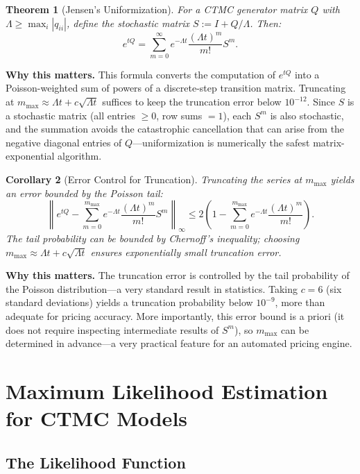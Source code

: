 \documentclass[11pt,a4paper,openany]{book}
\theoremstyle{definition}
\theoremstyle{plain}
\newtheorem{theorem}{Theorem}[chapter]
\newtheorem{corollary}[theorem]{Corollary}
\theoremstyle{remark}
\newcommand{\1}{\mathbbm{1}}
\begin{document}
\begin{theorem}[Jensen's Uniformization]
For a CTMC generator matrix $Q$ with $\Lambda \geq \max_{i} |q_{ii}|$, define the stochastic matrix $S := I + Q/\Lambda$. Then:
\[
\boxed{e^{tQ} = \sum_{m=0}^{\infty} e^{-\Lambda t} \frac{(\Lambda t)^{m}}{m!} S^{m}}.
\]
\end{theorem}

\medskip
\noindent\textbf{Why this matters.} This formula converts the computation of $e^{tQ}$ into a Poisson-weighted sum of powers of a discrete-step transition matrix. Truncating at $m_{\max} \approx \Lambda t + c\sqrt{\Lambda t}$ suffices to keep the truncation error below $10^{-12}$. Since $S$ is a stochastic matrix (all entries $\ge 0$, row sums $=1$), each $S^m$ is also stochastic, and the summation avoids the catastrophic cancellation that can arise from the negative diagonal entries of $Q$---uniformization is numerically the safest matrix-exponential algorithm.

\begin{corollary}[Error Control for Truncation]
Truncating the series at $m_{\max}$ yields an error bounded by the Poisson tail:
\[
\left\| e^{tQ} - \sum_{m=0}^{m_{\max}} e^{-\Lambda t} \frac{(\Lambda t)^{m}}{m!} S^{m} \right\|_{\infty} \leq 2\left(1 - \sum_{m=0}^{m_{\max}} e^{-\Lambda t} \frac{(\Lambda t)^{m}}{m!}\right).
\]
The tail probability can be bounded by Chernoff's inequality; choosing $m_{\max} \approx \Lambda t + c \sqrt{\Lambda t}$ ensures exponentially small truncation error.
\end{corollary}

\medskip
\noindent\textbf{Why this matters.} The truncation error is controlled by the tail probability of the Poisson distribution---a very standard result in statistics. Taking $c=6$ (six standard deviations) yields a truncation probability below $10^{-9}$, more than adequate for pricing accuracy. More importantly, this error bound is a priori (it does not require inspecting intermediate results of $S^m$), so $m_{\max}$ can be determined in advance---a very practical feature for an automated pricing engine.

\chapter{Maximum Likelihood Estimation for CTMC Models}

\section{The Likelihood Function}
\end{document}
